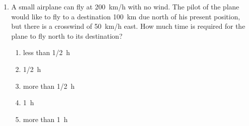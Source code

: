 \documentclass{../../oss-apphys}
\begin{document}
\begin{multicols}{2}
\begin{enumerate}[resume,leftmargin=18pt]
%    
    
  \item A small airplane can fly at \SI{200}{km/h} with no wind. The pilot of
    the plane would like to fly to a destination \SI{100}{km} due north of his
    present position, but there is a crosswind of \SI{50}{km/h} east. How much
    time is required for the plane to fly north to its destination?
    \begin{enumerate}[noitemsep,topsep=0pt,leftmargin=18pt,label=(\Alph*)]
    \item less than \SI{1/2}{\hour}
    \item \SI{1/2}{\hour}
    \item more than \SI{1/2}{\hour}
    \item \SI{1}{\hour}
    \item more than \SI{1}{\hour}
    \end{enumerate}
    

\end{enumerate}
\end{multicols}
\end{document}
